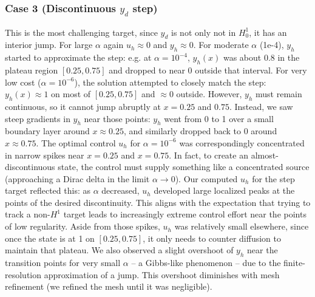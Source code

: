 \documentclass{article}
\begin{document}
\subsubsection{Case 3 (Discontinuous $y_d$ step)}
This is the most challenging target, since $y_d$ is not only not in $H^1_0$, it has an interior jump. For large $\alpha$ again $u_h\approx0$ and $y_h\approx0$. For moderate $\alpha$ (1e-4), $y_h$ started to approximate the step: e.g. at $\alpha=10^{-4}$, $y_h(x)$ was about 0.8 in the plateau region $[0.25,0.75]$ and dropped to near 0 outside that interval. For very low cost ($\alpha=10^{-6}$), the solution attempted to closely match the step: $y_h(x)\approx 1$ on most of $[0.25,0.75]$ and $\approx 0$ outside. However, $y_h$ must remain continuous, so it cannot jump abruptly at $x=0.25$ and $0.75$. Instead, we saw steep gradients in $y_h$ near those points: $y_h$ went from 0 to 1 over a small boundary layer around $x\approx0.25$, and similarly dropped back to 0 around $x\approx0.75$. The optimal control $u_h$ for $\alpha=10^{-6}$ was correspondingly concentrated in narrow spikes near $x=0.25$ and $x=0.75$. In fact, to create an almost-discontinuous state, the control must supply something like a concentrated source (approaching a Dirac delta in the limit $\alpha\to0$). Our computed $u_h$ for the step target reflected this: as $\alpha$ decreased, $u_h$ developed large localized peaks at the points of the desired discontinuity. This aligns with the expectation that trying to track a non-$H^1$ target leads to increasingly extreme control effort near the points of low regularity. Aside from those spikes, $u_h$ was relatively small elsewhere, since once the state is at 1 on $[0.25,0.75]$, it only needs to counter diffusion to maintain that plateau. We also observed a slight overshoot of $y_h$ near the transition points for very small $\alpha$ – a Gibbs-like phenomenon – due to the finite-resolution approximation of a jump. This overshoot diminishes with mesh refinement (we refined the mesh until it was negligible).
\end{document}
